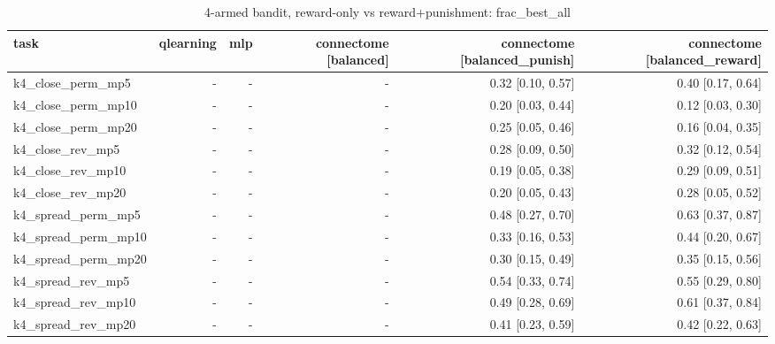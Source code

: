 \begin{table}[t]
\centering
\small
\begin{tabular}{lrrrrr}
\toprule
task & qlearning & mlp & connectome [balanced] & connectome [balanced\_punish] & connectome [balanced\_reward] \\
\midrule
k4\_close\_perm\_mp5 & - & - & - & 0.32 [0.10, 0.57] & 0.40 [0.17, 0.64] \\
k4\_close\_perm\_mp10 & - & - & - & 0.20 [0.03, 0.44] & 0.12 [0.03, 0.30] \\
k4\_close\_perm\_mp20 & - & - & - & 0.25 [0.05, 0.46] & 0.16 [0.04, 0.35] \\
k4\_close\_rev\_mp5 & - & - & - & 0.28 [0.09, 0.50] & 0.32 [0.12, 0.54] \\
k4\_close\_rev\_mp10 & - & - & - & 0.19 [0.05, 0.38] & 0.29 [0.09, 0.51] \\
k4\_close\_rev\_mp20 & - & - & - & 0.20 [0.05, 0.43] & 0.28 [0.05, 0.52] \\
k4\_spread\_perm\_mp5 & - & - & - & 0.48 [0.27, 0.70] & 0.63 [0.37, 0.87] \\
k4\_spread\_perm\_mp10 & - & - & - & 0.33 [0.16, 0.53] & 0.44 [0.20, 0.67] \\
k4\_spread\_perm\_mp20 & - & - & - & 0.30 [0.15, 0.49] & 0.35 [0.15, 0.56] \\
k4\_spread\_rev\_mp5 & - & - & - & 0.54 [0.33, 0.74] & 0.55 [0.29, 0.80] \\
k4\_spread\_rev\_mp10 & - & - & - & 0.49 [0.28, 0.69] & 0.61 [0.37, 0.84] \\
k4\_spread\_rev\_mp20 & - & - & - & 0.41 [0.23, 0.59] & 0.42 [0.22, 0.63] \\
\bottomrule
\end{tabular}
\caption{4-armed bandit, reward-only vs reward+punishment: frac\_best\_all}
\label{tab:bandit_punish_frac_best_all}
\end{table}